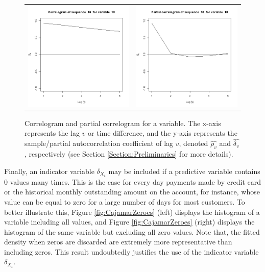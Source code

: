 \begin{figure}[htbp]
  \centering
   \begin{tabular}{cc}    
       \includegraphics[width=70mm]{figures/CajamarCorrelogram} &
        \includegraphics[width=70mm]{figures/CajamarPartialCorrelogram}
    \end{tabular}
     \caption{\label{fig:CajamarCorrelogramsAndPartial} Correlogram and partial correlogram for a variable. The x-axis represents the lag $v$ or time difference, and the y-axis represents the sample/partial autocorrelation coefficient of lag $v$, denoted $\hat{\rho_v}$ and $\hat{\delta_v}$, respectively (see Section \ref{Section:Preliminaries} for more details).}
\end{figure}

Finally, an indicator variable $\delta_{X_t}$ may be included if a predictive variable contains 0 values many times. This is the case for every day payments made by credit card or the historical monthly outstanding amount on the account, for instance, whose value can be equal to zero for a large number of days for most customers. To better illustrate this, Figure \ref{fig:CajamarZeroes} (left) displays the histogram of a variable including all values, and Figure \ref{fig:CajamarZeroes} (right) displays the histogram of the same variable but excluding all zero values. Note that, the fitted density when zeros are discarded are extremely more representative than including zeros. This result undoubtedly justifies the use of the indicator variable $\delta_{X_t}$.

